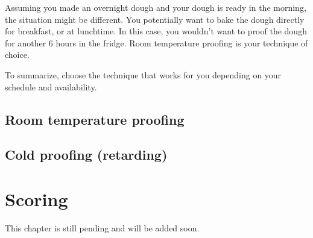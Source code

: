 Assuming you made an overnight dough and your dough is ready in the morning,
the situation might be different. You potentially want to bake the dough directly
for breakfast, or at lunchtime. In this case, you wouldn't want to proof the dough for
another 6 hours in the fridge. Room temperature proofing is your technique
of choice.

To summarize, choose the technique that works for you depending on your
schedule and availability.

\subsection{Room temperature proofing}



\subsection{Cold proofing (retarding)}

\section{Scoring}
This chapter is still pending and will be added soon.
